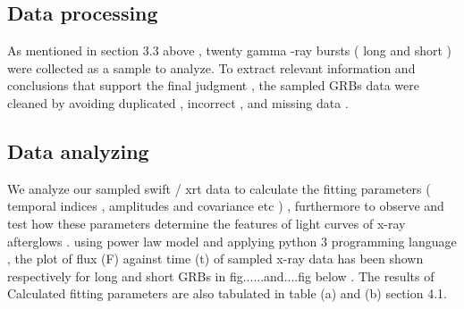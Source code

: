 \subsection{Data processing }
As mentioned in section 3.3 above ,  twenty  gamma -ray bursts ( long and short ) were  collected   as  a sample to  analyze. To extract relevant information and conclusions  that support   the  final  judgment ,  the sampled  GRBs  data   were cleaned by avoiding  duplicated  , incorrect  ,  and  missing  data .  
\subsection{Data analyzing}
We  analyze    our  sampled  swift / xrt  data  to   calculate  the  fitting  parameters ( temporal indices  ,   amplitudes and  covariance   etc ) , furthermore  to   observe   and  test  how  these   parameters   determine  the  features of  light curves  of  x-ray afterglows .  using   power law model  and  applying  python 3  programming   language ,  the  plot  of  flux (F)  against  time (t)  of  sampled  x-ray  data has been shown  respectively  for long and short  GRBs in fig......and....fig  below .  The  results  of Calculated   fitting  parameters   are  also  tabulated in  table (a) and (b) section 4.1.
